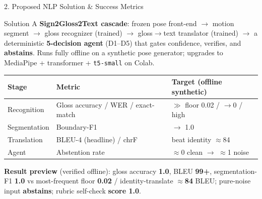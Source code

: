 \documentclass[10pt,aspectratio=169]{beamer}
\begin{document}
\begin{frame}{2. Proposed NLP Solution \& Success Metrics}
\begin{block}{Solution}
A \textbf{Sign2Gloss2Text cascade}: frozen pose front-end $\rightarrow$ motion segment $\rightarrow$ gloss recognizer (trained) $\rightarrow$ gloss$\rightarrow$text translator (trained) $\rightarrow$ a deterministic \textbf{5-decision agent} (D1--D5) that gates confidence, verifies, and \textbf{abstains}. Runs fully offline on a synthetic pose generator; upgrades to MediaPipe + transformer + \texttt{t5-small} on Colab.
\end{block}

\begin{table}[h]
\centering\small
\begin{tabular}{lll}
\toprule
\textbf{Stage} & \textbf{Metric} & \textbf{Target (offline synthetic)} \\
\midrule
Recognition & Gloss accuracy / WER / exact-match & $\gg$ floor 0.02 / $\rightarrow$0 / high \\
Segmentation & Boundary-F1 & $\rightarrow$ 1.0 \\
Translation & BLEU-4 (headline) / chrF & beat identity $\approx$84 \\
Agent & Abstention rate & $\approx$0 clean $\rightarrow$ $\approx$1 noise \\
\bottomrule
\end{tabular}
\end{table}

\textbf{Result preview} (verified offline): gloss accuracy \textbf{1.0}, BLEU \textbf{99+}, segmentation-F1 \textbf{1.0} vs most-frequent floor \textbf{0.02} / identity-translate \textbf{$\approx$84} BLEU; pure-noise input \textbf{abstains}; rubric self-check \textbf{score 1.0}.
\end{frame}
\end{document}
